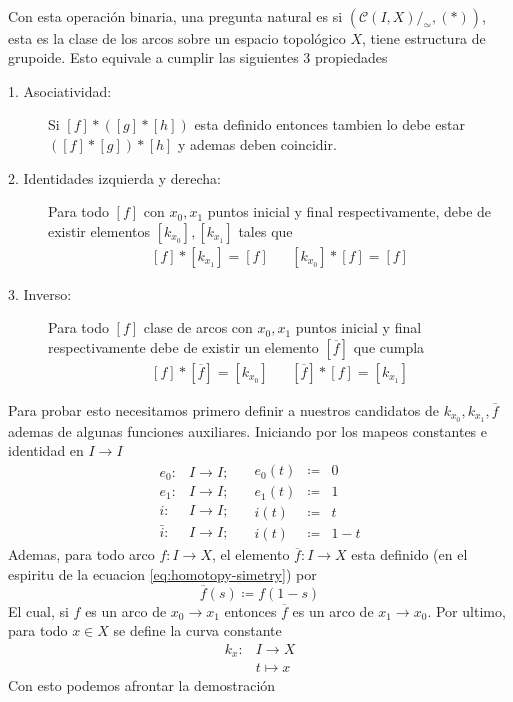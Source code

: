 \paragraph{} Con esta operación binaria, una pregunta natural es si
\((\mathcal C (I , X)/_\simeq , (*))\), esta es la clase de los arcos
sobre un espacio topológico \(X\), tiene estructura de grupoide. Esto
equivale a cumplir las siguientes 3 propiedades
\begin{description}
\item[1. Asociatividad:] Si \([f] * ([g] * [h])\) esta definido entonces
  tambien lo debe estar \(([f] * [g]) * [h]\) y ademas deben coincidir.
\item[2. Identidades izquierda y derecha:] Para todo \([f]\) con
  \(x_0, x_1\) puntos inicial y final respectivamente, debe de
existir elementos \([k_{x_0}], [k_{x_1}]\) tales que
\[ \begin{matrix}
    [f] * [k_{x_1}] = [f] & & [k_{x_0}] * [f] = [f]
  \end{matrix}
\]
\item[3. Inverso:] Para todo \([f]\) clase de arcos con \(x_0, x_1\)
  puntos inicial y final respectivamente debe de existir un elemento
  \([\overline f]\) que cumpla
\[ \begin{matrix}
    [f] * [\overline{f}] = [k_{x_0}] & & [\overline{f}] * [f] = [k_{x_1}]
  \end{matrix}
\]
\end{description}
Para probar esto necesitamos primero definir a nuestros candidatos de
\(k_{x_0}, k_{x_1}, \overline{f}\) ademas de algunas funciones auxiliares.
Iniciando por los mapeos constantes e identidad en \(I \to I\)
\begin{equation} \label{eq:def-auxiliar-grupoide}
  \begin{matrix}
     e_0 :     & I \to I; \\
     e_1 :     & I \to I; \\
     i :       & I \to I; \\
     \bar{i} : & I \to I;
   \end{matrix}
   \quad
   \begin{matrix}
      e_0(t) &\coloneqq &0 \\
      e_1(t) &\coloneqq &1 \\
      i(t)   &\coloneqq &t   \\
      i(t)   &\coloneqq &1 - t
   \end{matrix}
\end{equation}
Ademas, para todo arco \(f : I \to X \), el elemento \(\overline{f} : I
\to X \) esta definido (en el espiritu de la ecuacion
\eqref{eq:homotopy-simetry}) por
\begin{equation}
  \overline{f} (s) \coloneqq f (1 - s) \label{def:camino-inverso}
\end{equation}
El cual, si \(f\) es un arco de \(x_0 \to x_1\) entonces \(\overline{f}\) es
un arco de \(x_1 \to x_0\). Por ultimo, para todo \(x \in X \) se define
la curva constante
\begin{align*}
  k_x : &I \longrightarrow X \\
        &t \longmapsto x
\end{align*}
Con esto podemos afrontar la demostración

